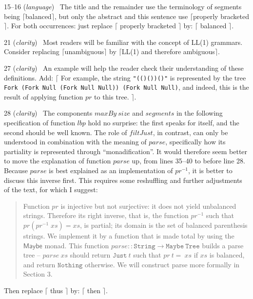 \newcommand{\comment}[2]{{\small#1} (\textit{#2})~}
\newcommand{\cq}[1]{$\lceil$#1$\rceil$}
\newcommand{\eplace}[2]{eplace \cq{#1} by: \cq{#2}.}
\newcommand{\preplace}[3]{#1 r\eplace{#2}{#3}}
\newcommand{\replace}[2]{R\eplace{#1}{#2}}
\newcommand{\add}[1]{Add: \cq{#1}.}

\comment{15--16}{language}
The title and the remainder use the terminology of segments being \cq{balanced}, but only the abstract and this sentence use \cq{properly bracketed}. For both occurrences: \preplace{just}{
properly bracketed
}{
balanced
}

\comment{21}{clarity}
Most readers will be familiar with the concept of LL(1) grammars. Consider replacing \cq{unambiguous} by \cq{LL(1) and therefore ambiguous}.

\comment{27}{clarity}
An example will help the reader check their understanding of these definitions.
\add{
For example, the string \texttt{"(()())()"} is represented by the tree \texttt{Fork (Fork Null (Fork Null Null)) (Fork Null Null)}, and indeed, this is the result of applying function $pr$ to this tree.
}

\comment{28}{clarity}
The components $maxBy~size$ and $segments$ in the following specification of function $lbp$ hold no surprise: the first speaks for itself, and the second should be well known. The role of $filtJust$, in contrast, can only be understood in combination with the meaning of $parse$, specifically how its partiality is represented through ``monadification''. It would therefore seem better to move the explanation of function $parse$ up, from lines 35--40 to before line 28. Because $parse$ is best explained as an implementation of $pr^{{-}1}$, it is better to discuss this inverse first. This requires some reshuffling and further adjustments of the text, for which I suggest:
\begin{quote}Function $pr$ is injective but not surjective: it does not yield unbalanced strings. Therefore its right inverse, that is, the function $pr^{{-}1}$ such that $pr(pr^{{-}1}\;xs)=xs$, is partial; its domain is the set of balanced parenthesis strings. We implement it by a function that is made total by using the $\mathsf{Maybe}$ monad. This function $parse :: \mathtt{String} \to \mathtt{Maybe~Tree}$ builds a parse tree -- $parse~xs$ should return $\mathtt{Just}~t$ such that $pr~t =~xs$ if $xs$ is balanced, and return $\mathtt{Nothing}$ otherwise. We will construct parse more formally in Section 3.\end{quote}
\preplace{Then}{
thus
}{
then
}


